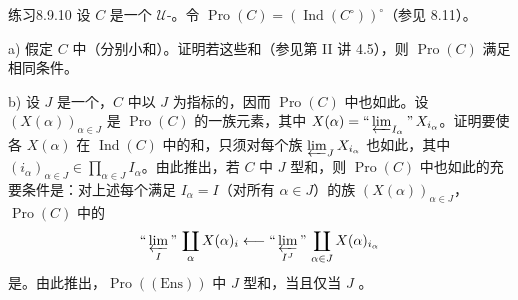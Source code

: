\begin{SGAresult}{练习}{8.9.10}
设 $C$ 是一个 $\mathcal U$-。令 $\operatorname{Pro}(C)=(\operatorname{Ind}(C^\circ))^\circ$（参见 8.11）。

 a) 假定 $C$ 中（分别小和）。证明若这些和（参见第 II 讲 4.5），则 $\operatorname{Pro}(C)$ 满足相同条件。

 b) 设 $J$ 是一个，$C$ 中以 $J$ 为指标的，因而 $\operatorname{Pro}(C)$ 中也如此。设 $(X(\alpha))_{\alpha\in J}$ 是 $\operatorname{Pro}(C)$ 的一族元素，其中 $X(\alpha)=\text{“}\varprojlim_{I_\alpha}\text{”}\,X_{i_\alpha}$。证明要使各 $X(\alpha)$ 在 $\operatorname{Ind}(C)$ 中的和，只须对每个族 $\varprojlim_JX_{i_\alpha}$ 也如此，其中 $(i_\alpha)_{\alpha\in J}\in\prod_{\alpha\in J}I_\alpha$。由此推出，若 $C$ 中 $J$ 型和，则 $\operatorname{Pro}(C)$ 中也如此的充要条件是：对上述每个满足 $I_\alpha=I$（对所有 $\alpha\in J$）的族 $(X(\alpha))_{\alpha\in J}$，$\operatorname{Pro}(C)$ 中的
\[
\text{“}\varprojlim_I\text{”}\,\coprod_\alpha X(\alpha)_i
\longleftarrow
\text{“}\varprojlim_{I^J}\text{”}\,\coprod_{\alpha\in J}X(\alpha)_{i_\alpha}
\]
是。由此推出，$\operatorname{Pro}((\mathrm{Ens}))$ 中 $J$ 型和，当且仅当 $J$ 。
\end{SGAresult}
